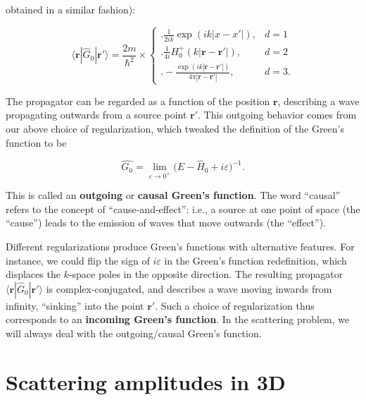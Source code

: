 \documentclass[pra,12pt]{revtex4}
\begin{document}
obtained in a similar fashion):
\begin{framed}
  \begin{equation}
    \langle\mathbf{r}|\hat{G}_0|\mathbf{r}'\rangle = \frac{2m}{\hbar^2} \times \begin{cases} \Bigg.\displaystyle\frac{1}{2ik} \exp\left(ik|x-x'|\right),& d=1\\ \Bigg. \displaystyle\frac{1}{4i} H^+_0(k|\mathbf{r}-\mathbf{r'}|), & d=2 \\ \displaystyle \Bigg. - \frac{\exp\left(ik|\mathbf{r}-\mathbf{r}'|\right)}{4\pi|\mathbf{r}-\mathbf{r}'|}, & d = 3.  \end{cases}
  \end{equation}
\end{framed}

\vskip -0.15in
The propagator can be regarded as a function of the position
$\mathbf{r}$, describing a wave propagating outwards from a source
point $\mathbf{r}'$.  This outgoing behavior comes from our above
choice of regularization, which tweaked the definition of the Green's
function to be
\begin{framed}
  \begin{equation}
    \hat{G_0} = \lim_{\varepsilon\rightarrow 0^+} \big(E - \hat{H}_0 + i \varepsilon\big)^{-1}.
  \end{equation}
\end{framed}
\vskip -0.15in
\noindent
This is called an \textbf{outgoing} or \textbf{causal Green's
  function}.  The word ``causal'' refers to the concept of
``cause-and-effect'': i.e., a source at one point of space (the
``cause'') leads to the emission of waves that move outwards (the
``effect'').

Different regularizations produce Green's functions with alternative
features.  For instance, we could flip the sign of $i\varepsilon$ in
the Green's function redefinition, which displaces the $k$-space poles
in the opposite direction.  The resulting propagator
$\langle\mathbf{r}|\hat{G}_0|\mathbf{r}'\rangle$ is
complex-conjugated, and describes a wave moving inwards from infinity,
``sinking'' into the point $\mathbf{r}'$.  Such a choice of
regularization thus corresponds to an \textbf{incoming Green's
  function}.  In the scattering problem, we will always deal with the
outgoing/causal Green's function.

\section{Scattering amplitudes in 3D}
\label{sec:3damp}
\end{document}
